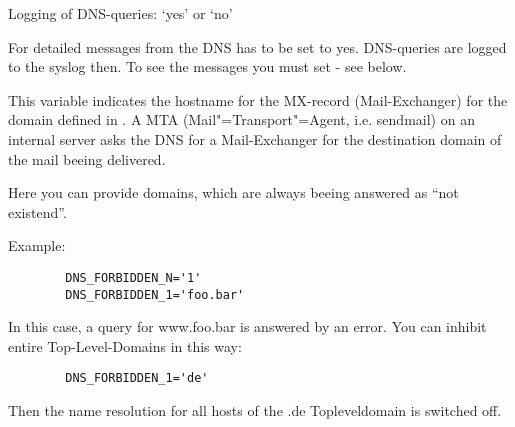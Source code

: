 \begin{description}

    { Logging of DNS-queries: `yes' or `no'

      For detailed messages from the DNS  has to be set to yes.
      DNS-queries are logged to the syslog then. To see the messages you must set
       - see below.}



      {This variable indicates the hostname for the MX-record (Mail-Exchanger)
      for the domain defined in . A MTA (Mail"=Transport"=Agent,
      i.e. sendmail) on an internal server asks the DNS for a Mail-Exchanger
      for the destination domain of the mail beeing delivered.

      }



    {Here you can provide domains, which are always beeing answered as ``not existend''.

      Example:

\begin{example}
\begin{verbatim}
        DNS_FORBIDDEN_N='1'
        DNS_FORBIDDEN_1='foo.bar'
\end{verbatim}
\end{example}

      In this case, a query for www.foo.bar is answered by an error.
      You can inhibit entire Top-Level-Domains in this way:

\begin{example}
\begin{verbatim}
        DNS_FORBIDDEN_1='de'
\end{verbatim}
\end{example}

      Then the name resolution for all hosts of the .de Topleveldomain is switched off.}




\end{description}
